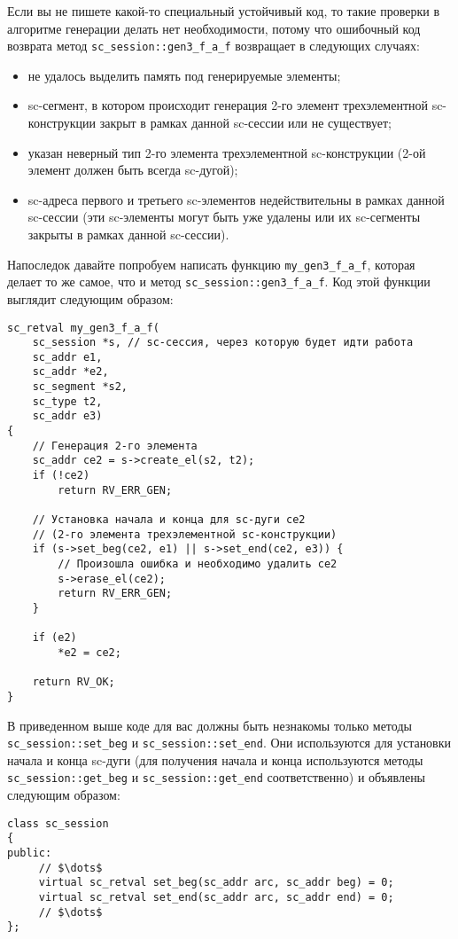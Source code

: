 Если вы не пишете какой-то специальный устойчивый код, то такие
проверки в алгоритме генерации делать нет необходимости, потому что
ошибочный код возврата метод \lstinline|sc_session::gen3_f_a_f|
возвращает в следующих случаях:
\begin{itemize}
\item не удалось выделить память под генерируемые элементы;
\item sc-сегмент, в котором происходит генерация 2-го элемент
  трехэлементной sc-конструкции закрыт в рамках данной sc-сессии или
  не существует;
\item указан неверный тип 2-го элемента трехэлементной sc-конструкции
  (2-ой элемент должен быть всегда sc-дугой);
\item sc-адреса первого и третьего sc-элементов недействительны в
  рамках данной sc-сессии (эти sc-элементы могут быть уже удалены или
  их sc-сегменты закрыты в рамках данной sc-сессии).
\end{itemize}

Напоследок давайте попробуем написать функцию
\lstinline|my_gen3_f_a_f|, которая делает то же самое, что и метод
\lstinline|sc_session::gen3_f_a_f|. Код этой функции выглядит
следующим образом:
\begin{lstlisting}[texcl]
sc_retval my_gen3_f_a_f(
    sc_session *s, // sc-сессия, через которую будет идти работа
    sc_addr e1,
    sc_addr *e2,
    sc_segment *s2,
    sc_type t2,
    sc_addr e3)
{
    // Генерация 2-го элемента
    sc_addr ce2 = s->create_el(s2, t2);
    if (!ce2)
        return RV_ERR_GEN;

    // Установка начала и конца для sc-дуги ce2
    // (2-го элемента трехэлементной sc-конструкции)
    if (s->set_beg(ce2, e1) || s->set_end(ce2, e3)) {
        // Произошла ошибка и необходимо удалить ce2
        s->erase_el(ce2);
        return RV_ERR_GEN;
    }

    if (e2)
        *e2 = ce2;

    return RV_OK;
}
\end{lstlisting}

В приведенном выше коде для вас должны быть незнакомы только методы
\lstinline|sc_session::set_beg| и \lstinline|sc_session::set_end|. Они
используются для установки начала и конца sc-дуги (для получения
начала и конца используются методы \lstinline|sc_session::get_beg| и
\lstinline|sc_session::get_end| соответственно) и объявлены следующим
образом:
\begin{lstlisting}[texcl]
class sc_session
{
public:
     // $\dots$
     virtual sc_retval set_beg(sc_addr arc, sc_addr beg) = 0;
     virtual sc_retval set_end(sc_addr arc, sc_addr end) = 0;
     // $\dots$
};
\end{lstlisting}

